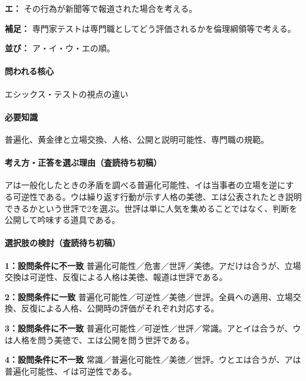 \noindent\textbf{エ：} その行為が新聞等で報道された場合を考える。\par

\noindent\textbf{補足：} 専門家テストは専門職としてどう評価されるかを倫理綱領等で考える。\par

\noindent\textbf{並び：} ア・イ・ウ・エの順。\par

\paragraph{問われる核心} エシックス・テストの視点の違い

\paragraph{必要知識} 普遍化、黄金律と立場交換、人格、公開と説明可能性、専門職の規範。

\paragraph{考え方・正答を選ぶ理由（査読待ち初稿）} アは一般化したときの矛盾を調べる普遍化可能性、イは当事者の立場を逆にする可逆性である。ウは繰り返す行動が示す人格の美徳、エは公表されたとき説明できるかという世評で2を選ぶ。世評は単に人気を集めることではなく、判断を公開して吟味する道具である。

\paragraph{選択肢の検討（査読待ち初稿）}\mbox{}\par

\noindent\textbf{1：設問条件に不一致} 普遍化可能性／危害／世評／美徳。アだけは合うが、立場交換は可逆性、反復による人格は美徳、報道は世評である。\par

\noindent\textbf{2：設問条件に一致} 普遍化可能性／可逆性／美徳／世評。全員への適用、立場交換、反復による人格、公開時の評価がそれぞれ対応する。\par

\noindent\textbf{3：設問条件に不一致} 普遍化可能性／可逆性／世評／常識。アとイは合うが、ウは人格を問う美徳で、エは公開を問う世評である。\par

\noindent\textbf{4：設問条件に不一致} 常識／普遍化可能性／美徳／世評。ウとエは合うが、アは普遍化可能性、イは可逆性である。\par

